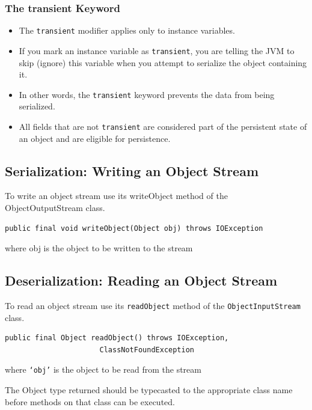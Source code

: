\documentclass[11pt,a4paper]{article}
\begin{document}
\subsubsection*{The transient Keyword}
\begin{itemize}
    \item The \texttt{transient} modifier applies only to instance variables. 
    \item If you mark an instance variable as \texttt{transient}, you are telling the JVM to skip (ignore) this variable when you attempt to serialize the object containing it. 
    \item In other words, the \texttt{transient} keyword prevents the data from being serialized. 
    \item All fields that are not \texttt{transient} are considered part of the persistent state of an object and are eligible for persistence.
\end{itemize}

\subsection*{Serialization: Writing an Object Stream}
To write an object stream use its writeObject method of the ObjectOutputStream class. 
\begin{lstlisting}[numbers=none]
public final void writeObject(Object obj) throws IOException
\end{lstlisting}

where obj is the object to be written to the stream



\subsection*{Deserialization: Reading an Object Stream}
To read an object stream use its \texttt{readObject} method of the \texttt{ObjectInputStream} class. 
\begin{lstlisting}[numbers=none]
public final Object readObject() throws IOException, 
                      ClassNotFoundException
\end{lstlisting}

where \texttt{`obj'} is the object to be read from the stream 

The Object type returned should be typecasted to the appropriate class name before methods on that class can be executed. 

\end{document}
